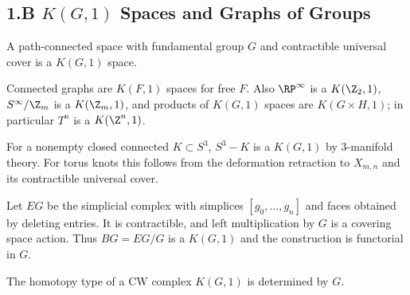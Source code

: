\subsection{1.B $K(G,1)$ Spaces and Graphs of Groups}
\label{sec:kg1-spaces-graphs-of-groups}

\begin{definition}[$K(G,1)$ space]
\label{def:k-g-1-space}


A path-connected space with fundamental group $G$ and contractible universal
cover is a $K(G,1)$ space.
\end{definition}

\begin{example}
\label{ex:graphs-are-kg1}

Connected graphs are $K(F,1)$ spaces for free $F$. Also $\RP^\infty$ is a
$K(\Z_2,1)$, $S^\infty/\Z_m$ is a $K(\Z_m,1)$, and products of $K(G,1)$
spaces are $K(G\times H,1)$; in particular $T^n$ is a $K(\Z^n,1)$.
\end{example}

\begin{example}
\label{ex:knot-complement-in-s3-kg1}

For a nonempty closed connected $K\subset S^3$, $S^3-K$ is a $K(G,1)$ by
3-manifold theory. For torus knots this follows from the deformation
retraction to $X_{m,n}$ and its contractible universal cover.
\end{example}

\begin{example}
\label{ex:milnor-construction-eg-bg}

Let $EG$ be the simplicial complex with simplices $[g_0,\ldots,g_n]$ and
faces obtained by deleting entries. It is contractible, and left multiplication
by $G$ is a covering space action. Thus $BG=EG/G$ is a $K(G,1)$ and the
construction is functorial in $G$.
\end{example}

\begin{theorem}
\label{thm:kg1-unique-homotopy-type}

The homotopy type of a CW complex $K(G,1)$ is determined by $G$.
\end{theorem}

